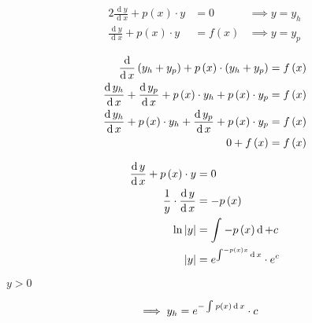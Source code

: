 \documentclass[18pt]{report}
\def\lthtmlcheckvsize{\ifdim\ht\sizebox<\vsize 
  \ifdim\wd\sizebox<\hsize\expandafter\hfill\fi \expandafter\vfill
  \else\expandafter\vss\fi}%
\begin{document}
{\newpage\clearpage
{}%
\begin{alignat}{2}
  \frac{\operatorname{d}y }{\operatorname{d} x}+ p\left( x \right)\cdot  y&= 0 &\implies  y= y_h
\\
  \frac{\operatorname{d}y }{\operatorname{d} x}+ p\left( x \right)\cdot  y&= f(x) &\implies  y= y_p
\end{alignat}%
\lthtmlfigureZ
\lthtmlcheckvsize\clearpage}

{\newpage\clearpage
{}%
\begin{align}
\frac{\operatorname{d} }{\operatorname{d} x}\left( y_h+ y_p \right)+ p\left( x \right)\cdot  \left( y_h+ y_p \right)&= f\left( x \right)\notag \\
\frac{\operatorname{d}y_h }{\operatorname{d} x}+ \frac{\operatorname{d}y_p }{\operatorname{d} x}+ p\left( x \right)\cdot  y_h + p\left( x \right)\cdot  y_p   &= f\left( x \right)\notag \\
\frac{\operatorname{d}y_h }{\operatorname{d} x}+ p\left( x \right)\cdot  y_h    + \frac{\operatorname{d}y_p }{\operatorname{d} x}+ p\left( x \right)\cdot  y_p  &= f\left( x \right)\notag \\
0 +  f\left( x \right)&= f\left( x \right)
\end{align}%
\lthtmlfigureZ
\lthtmlcheckvsize\clearpage}

{\newpage\clearpage
{}%
\begin{align}
\frac{\operatorname{d}y }{\operatorname{d} x}+ p\left( x \right) \cdot  y &= 0\notag \\
\frac{1}{y}\cdot  \frac{\operatorname{d}y }{\operatorname{d} x}&= - p\left( x \right)\notag \\
\ln{ \left| y \right| }&= \int^{}_{} - p\left( x \right)  \operatorname{d}+ c\notag \\
\left| y \right|&= e^{\int^{- p\left( x \right)x}_{}   \operatorname{d}x }\cdot  e^c
\end{align}%
\lthtmlfigureZ
\lthtmlcheckvsize\clearpage}

{\newpage\clearpage
{}%
$y>0$%
\lthtmlindisplaymathZ
\lthtmlcheckvsize\clearpage}

{\newpage\clearpage
{}%
\begin{align}
\implies y_h&= e^{- \int^{}_{} p\left( x \right)  \operatorname{d}x }\cdot  c \notag
\end{align}%
\lthtmlfigureZ
\lthtmlcheckvsize\clearpage}
\end{document}
